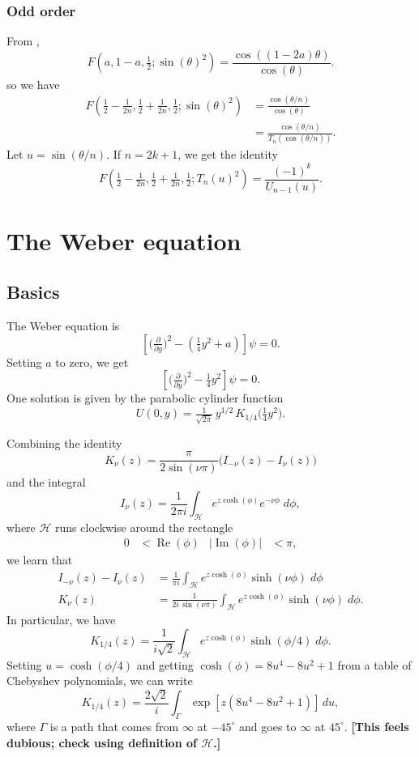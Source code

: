 \documentclass{article}
\begin{document}
\subsubsection{Odd order}
From \cite[equation~15.4.14]{dlmf},
\[ F(a, 1-a, \tfrac{1}{2}; \sin(\theta)^2) = \frac{\cos((1-2a)\theta)}{\cos(\theta)}. \]
so we have
\begin{align*}
F\left(\tfrac{1}{2} - \tfrac{1}{2n}, \tfrac{1}{2} + \tfrac{1}{2n}, \tfrac{1}{2}; \sin(\theta)^2\right) & = \frac{\cos(\theta/n)}{\cos(\theta)} \\
& = \frac{\cos(\theta/n)}{T_n(\cos(\theta/n))}.
\end{align*}
Let $u = \sin(\theta/n)$. If $n = 2k + 1$, we get the identity
\[ F\left(\tfrac{1}{2} - \tfrac{1}{2n}, \tfrac{1}{2} + \tfrac{1}{2n}, \tfrac{1}{2}; T_n(u)^2\right) = \frac{(-1)^k}{U_{n-1}(u)}. \]
\section{The Weber equation}
\subsection{Basics}
The Weber equation is
\[ \left[\big(\tfrac{\partial}{\partial y}\big)^2 - \left(\tfrac{1}{4}y^2 + a\right)\right] \psi = 0. \]
Setting $a$ to zero, we get
\begin{equation}\label{eqn:weber}
\left[\big(\tfrac{\partial}{\partial y}\big)^2 - \tfrac{1}{4}y^2\right] \psi = 0.
\end{equation}
One solution is given by the parabolic cylinder function~\cite[equation~12.7.10]{dlmf}
\[ U(0, y) = \tfrac{1}{\sqrt{2\pi}}\,y^{1/2}\,K_{1/4}\big(\tfrac{1}{4} y^2\big). \]

Combining the identity \cite[equation~10.27.4]{dlmf}
\[ K_\nu(z) = \frac{\pi}{2 \sin(\nu \pi)}\big(I_{-\nu}(z) - I_\nu(z)\big) \]
and the integral \cite[equation~10.32.12]{dlmf}
\[ I_\nu(z) = \frac{1}{2\pi i} \int_{\mathcal{H}} e^{z \cosh(\phi)} e^{-\nu \phi}\;d\phi, \]
where $\mathcal{H}$ runs clockwise around the rectangle
\begin{align*}
0 & < \operatorname{Re}(\phi) & |\operatorname{Im}(\phi)| & < \pi,
\end{align*}
we learn that
\begin{align*}
I_{-\nu}(z) - I_\nu(z) & = \frac{1}{\pi i} \int_{\mathcal{H}} e^{z \cosh(\phi)} \sinh(\nu \phi)\;d\phi \\
K_\nu(z) & = \frac{1}{2i\,\sin(\nu \pi)} \int_{\mathcal{H}} e^{z \cosh(\phi)} \sinh(\nu \phi)\;d\phi.
\end{align*}
In particular, we have
\[ K_{1/4}(z) = \frac{1}{i\sqrt{2}} \int_{\mathcal{H}} e^{z \cosh(\phi)} \sinh(\phi/4)\;d\phi. \]
Setting $u = \cosh(\phi/4)$ and getting $\cosh(\phi) = 8u^4 - 8u^2 + 1$ from a table of Chebyshev polynomials, we can write
\begin{equation}\label{integral:watson}
K_{1/4}(z) = \frac{2\sqrt{2}}{i} \int_\Gamma \exp\left[z \left(8u^4 - 8u^2 + 1\right)\right]\,du,
\end{equation}
where $\Gamma$ is a path that comes from $\infty$ at $-45^\circ$ and goes to $\infty$ at $45^\circ$. \textbf{[This feels dubious; check using definition of $\mathcal{H}$.]}
\end{document}
